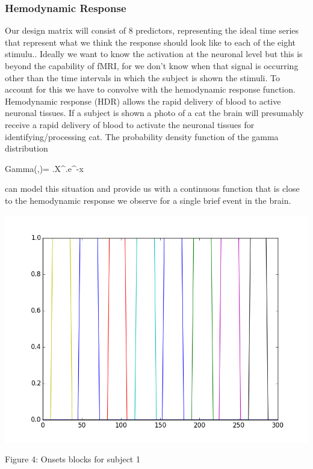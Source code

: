 \documentclass[12pt]{article}
\begin{document}
\subsubsection{Hemodynamic Response}

Our design matrix will consist of 8 predictors, representing the ideal time series 
that represent what we think the response should look like to each of the eight 
stimulu.. Ideally we want to know the activation at the neuronal level but 
this is beyond the capability of fMRI, for we don’t know when that signal 
is occurring other than the time intervals in which the subject is shown the 
stimuli. To account for this we have to convolve with the hemodynamic response 
function. Hemodynamic response (HDR) allows the rapid delivery of blood to 
active neuronal tissues. If a subject is shown a photo of a cat the brain will 
presumably receive a rapid delivery of blood to activate the neuronal tissues 
for identifying/processing cat. The probability density function of the gamma 
distribution
	

           Gamma(\alpha ,\beta )= \frac{\beta ^{\alpha }}{\Gamma (\alpha )}.X^{}.e^{-\beta x}

can model this situation and provide us with a continuous function that is 
close to the hemodynamic response we observe for a single brief event in the 
brain.

\begin{housevseverything}
    \centering
      \includegraphics[width=1\textwidth]{block}
    \caption{Figure 4: Onsets blocks for subject 1}
\end{housevseverything}
\end{document}

